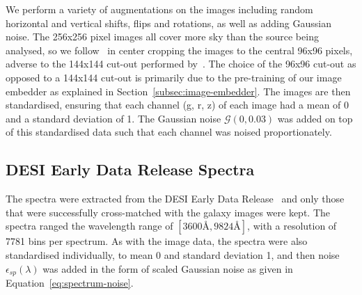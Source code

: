 We perform a variety of augmentations on the images including random horizontal and vertical shifts, flips and rotations,
as well as adding Gaussian noise.
The 256x256 pixel images all cover more sky than the source being analysed, so we follow~\cite{stein2022} in center
cropping the images to the central 96x96 pixels, adverse to the 144x144 cut-out performed by~\cite{astroclip}.
The choice of the 96x96 cut-out as opposed to a 144x144 cut-out is primarily due to the pre-training of our image embedder
as explained in Section~\eqref{subsec:image-embedder}.
The images are then standardised, ensuring that each channel (g, r, z) of each image had a mean
of 0 and a standard deviation of 1.
The Gaussian noise $\mathcal{G}(0, 0.03)$ was added on top of this standardised data such that each channel was noised
proportionately.


\subsection{DESI Early Data Release Spectra}\label{subsec:spectra}
The spectra were extracted from the DESI Early Data Release~\citep{desiearly2023} and only those that were successfully
cross-matched with the galaxy images were kept.
The spectra ranged the wavelength range of $[3600 \si{\angstrom}, 9824 \si{\angstrom}]$, with a resolution of 7781 bins per spectrum.
As with the image data, the spectra were also standardised individually, to mean 0 and standard deviation 1, and then
noise $\epsilon_{sp}(\lambda)$ was added in the form of scaled Gaussian noise as given in Equation~\eqref{eq:spectrum-noise}.

